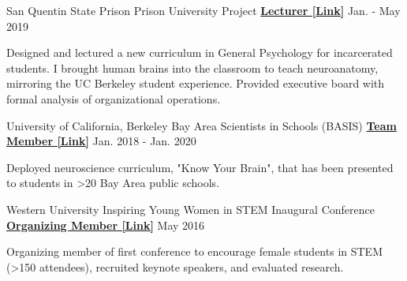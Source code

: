 \begin{cventries}
\begin{cventries}
\end{cventries}
    

\begin{cventries}

  \cventry
    {San Quentin State Prison} %
    {Prison University Project}
    {\href{https://www.neh.gov/about/awards/national-humanities-medals/prison-university-project}{\textbf{Lecturer [Link]}}} %
    {Jan. - May 2019} %
    {
      \begin{cvitems} %
        \item {Designed and lectured a new curriculum in General Psychology for incarcerated students. I brought human brains into the classroom to teach neuroanatomy, mirroring the UC Berkeley student experience. Provided executive board with formal analysis of organizational operations.}
      \end{cvitems}
    }

  \cventry
  	{University of California, Berkeley} %
  	{Bay Area Scientists in Schools (BASIS)}
    {\href{https://docs.google.com/document/d/1EgLHC_wA5ZApCDpqfWc4APGsVKdoymPw/edit?usp=sharing&ouid=110847987931723045299&rtpof=true&sd=true}{\textbf{Team Member [Link]}}} %
    {Jan. 2018 - Jan. 2020} %
    {
      \begin{cvitems} %
        \item {Deployed neuroscience curriculum, "Know Your Brain", that has been presented to students in >20 Bay Area public schools.}
      \end{cvitems}
    }
    
  \cventry
    {Western University} %
    {Inspiring Young Women in STEM Inaugural Conference}
    {\href{https://www.inspiringdiversityinstem.com/2016-conference}{\textbf{Organizing Member [Link]}}} %
    {May 2016} %
    {
      \begin{cvitems} %
        \item {Organizing member of first conference to encourage female students in STEM (>150 attendees), recruited keynote speakers, and evaluated research.}
      \end{cvitems}
    }
    

\end{cventries}
\end{cventries}
